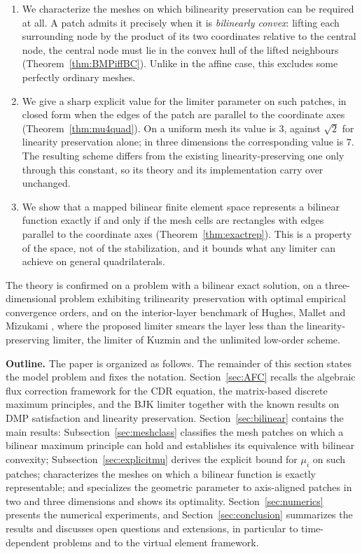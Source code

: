 \documentclass[a4paper]{article}
\theoremstyle{plain}
\theoremstyle{definition}
\theoremstyle{remark}
\begin{document}
\begin{enumerate}[leftmargin=*, itemsep=0.4em]

	\item We characterize the meshes on which bilinearity preservation can be required
	at all. A patch admits it precisely when it is \emph{bilinearly convex}: lifting
	each surrounding node by the product of its two coordinates relative to the central
	node, the central node must lie in the convex hull of the lifted neighbours
	(Theorem~\ref{thm:BMPiffBC}). Unlike in the affine case, this excludes some
	perfectly ordinary meshes. 

	\item We give a sharp explicit value for the limiter parameter on such patches, in
	closed form when the edges of the patch are parallel to the coordinate axes
	(Theorem~\ref{thm:mu4quad}). On a uniform mesh its value is $3$, against $\sqrt{2}$
	for linearity preservation alone; in three dimensions the corresponding value is
	$7$. The resulting scheme differs from the existing linearity-preserving one only
	through this constant, so its theory \cite{BJK25} and its implementation carry
	over unchanged. 

	\item We show that a mapped bilinear finite element space represents a bilinear
	function exactly if and only if the mesh cells are rectangles with edges parallel to
	the coordinate axes (Theorem~\ref{thm:exactrep}). This is a property of the space,
	not of the stabilization, and it bounds what any limiter can achieve on general
	quadrilaterals.

\end{enumerate}

The theory is confirmed on a problem with a bilinear exact solution, on a
three-dimensional problem exhibiting trilinearity preservation with optimal empirical
convergence orders, and on the interior-layer benchmark of Hughes, Mallet and Mizukami
\cite{HMM86}, where the proposed limiter smears the layer less than the
linearity-preserving limiter, the limiter of Kuzmin \cite{KM05} and the
unlimited low-order scheme.

\medskip
\noindent\textbf{Outline.} The paper is organized as follows. The remainder of this section states the model problem and fixes the notation. Section~\ref{sec:AFC} recalls the algebraic flux correction framework for the CDR equation, the matrix-based discrete maximum principles, and the BJK limiter together with the known results on DMP satisfaction and linearity preservation. Section~\ref{sec:bilinear} contains the main results: Subsection~\ref{sec:meshclass} classifies the mesh patches on which a bilinear maximum principle can hold and establishes its equivalence with bilinear convexity; Subsection~\ref{sec:explicitmu} derives the explicit bound for $\mu_i$ on such patches;  characterizes the meshes on which a bilinear function is exactly representable; and specializes the geometric parameter to axis-aligned patches in two and three dimensions and shows its optimality. Section~\ref{sec:numerics} presents the numerical experiments, and Section~\ref{sec:conclusion} summarizes the results and discusses open questions and extensions, in particular to time-dependent problems and to the virtual element framework.
\end{document}
